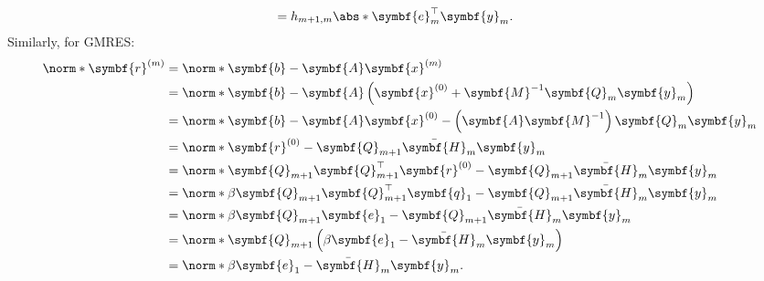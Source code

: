 \documentclass{article}
\begin{document}
\begin{appendix}
\begin{align*}
                                             & = h_{m+1,m} \abs*{\symbf{e}_m^\top \symbf{y}_m}.
    \end{align*}
    Similarly, for GMRES:
    \begin{align*}
        \norm*{\symbf{r}^{\left( m \right)}} & = \norm*{\symbf{b} - \symbf{A} \symbf{x}^{\left( m \right)}}                                                                   \\
                                             & = \norm*{\symbf{b} - \symbf{A} \left( \symbf{x}^{\left( 0 \right)} + \symbf{M}^{-1} \symbf{Q}_m \symbf{y}_m \right)}           \\
                                             & = \norm*{\symbf{b} - \symbf{A} \symbf{x}^{\left( 0 \right)} - \left( \symbf{A} \symbf{M}^{-1} \right) \symbf{Q}_m \symbf{y}_m} \\
                                             & = \norm*{\symbf{r}^{\left( 0 \right)} - \symbf{Q}_{m+1} \bar{\symbf{H}}_m \symbf{y}_m}                                         \\
                                             & = \norm*{\symbf{Q}_{m+1} \symbf{Q}_{m+1}^\top \symbf{r}^{\left( 0 \right)} - \symbf{Q}_{m+1} \bar{\symbf{H}}_m \symbf{y}_m}    \\
                                             & = \norm*{\beta \symbf{Q}_{m+1} \symbf{Q}_{m+1}^\top \symbf{q}_1 - \symbf{Q}_{m+1} \bar{\symbf{H}}_m \symbf{y}_m}               \\
                                             & = \norm*{\beta \symbf{Q}_{m+1} \symbf{e}_1 - \symbf{Q}_{m+1} \bar{\symbf{H}}_m \symbf{y}_m}                                    \\
                                             & = \norm*{\symbf{Q}_{m+1} \left( \beta \symbf{e}_1 - \bar{\symbf{H}}_m \symbf{y}_m \right)}                                     \\
                                             & = \norm*{\beta \symbf{e}_1 - \bar{\symbf{H}}_m \symbf{y}_m}.
    \end{align*}
\end{appendix}
\end{document}

